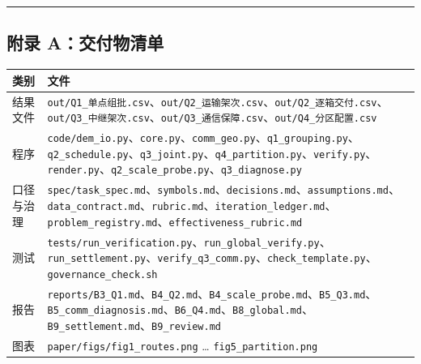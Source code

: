 \documentclass[
  10.5pt,
]{extarticle}
\newcounter{none} %
\begin{document}
\begin{center}\rule{0.5\linewidth}{0.5pt}\end{center}

\subsection{附录
A：交付物清单}\label{ux9644ux5f55-aux4ea4ux4ed8ux7269ux6e05ux5355}

{\def\LTcaptype{none} %
\begin{longtable}[]{@{}
  >{\raggedright\arraybackslash}p{}
  >{\raggedright\arraybackslash}p{}@{}}
\toprule\noalign{}
\begin{minipage}[b]{\linewidth}\raggedright
类别
\end{minipage} & \begin{minipage}[b]{\linewidth}\raggedright
文件
\end{minipage} \\
\midrule\noalign{}
\endhead
\bottomrule\noalign{}
\endlastfoot
结果文件 &
\texttt{out/Q1\_单点组批.csv}、\texttt{out/Q2\_运输架次.csv}、\texttt{out/Q2\_逐箱交付.csv}、\texttt{out/Q3\_中继架次.csv}、\texttt{out/Q3\_通信保障.csv}、\texttt{out/Q4\_分区配置.csv} \\
程序 &
\texttt{code/dem\_io.py}、\texttt{core.py}、\texttt{comm\_geo.py}、\texttt{q1\_grouping.py}、\texttt{q2\_schedule.py}、\texttt{q3\_joint.py}、\texttt{q4\_partition.py}、\texttt{verify.py}、\texttt{render.py}、\texttt{q2\_scale\_probe.py}、\texttt{q3\_diagnose.py} \\
口径与治理 &
\texttt{spec/task\_spec.md}、\texttt{symbols.md}、\texttt{decisions.md}、\texttt{assumptions.md}、\texttt{data\_contract.md}、\texttt{rubric.md}、\texttt{iteration\_ledger.md}、\texttt{problem\_registry.md}、\texttt{effectiveness\_rubric.md} \\
测试 &
\texttt{tests/run\_verification.py}、\texttt{run\_global\_verify.py}、\texttt{run\_settlement.py}、\texttt{verify\_q3\_comm.py}、\texttt{check\_template.py}、\texttt{governance\_check.sh} \\
报告 &
\texttt{reports/B3\_Q1.md}、\texttt{B4\_Q2.md}、\texttt{B4\_scale\_probe.md}、\texttt{B5\_Q3.md}、\texttt{B5\_comm\_diagnosis.md}、\texttt{B6\_Q4.md}、\texttt{B8\_global.md}、\texttt{B9\_settlement.md}、\texttt{B9\_review.md} \\
图表 & \texttt{paper/figs/fig1\_routes.png} \ldots{}
\texttt{fig5\_partition.png} \\
\end{longtable}
}
\end{document}

